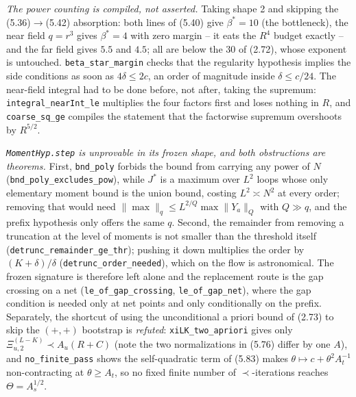 \begin{theorem}
  \emph{The power counting is compiled, not asserted.}  Taking shape 2 and skipping the
  (5.36)$\to$(5.42) absorption: both lines of (5.40) give $\beta^*=10$ (the bottleneck), the near
  field $q=r^3$ gives $\beta^*=4$ with zero margin -- it eats the $R^4$ budget exactly -- and the
  far field gives $5.5$ and $4.5$; all are below the $30$ of (2.72), whose exponent is untouched.
  \texttt{beta\_star\_margin} checks that the regularity hypothesis implies the side conditions as
  soon as $4\delta\le2c$, an order of magnitude inside $\delta\le c/24$.  The near-field integral
  had to be done before, not after, taking the supremum: \texttt{integral\_nearInt\_le} multiplies
  the four factors first and loses nothing in $R$, and \texttt{coarse\_sq\_ge} compiles the
  statement that the factorwise supremum overshoots by $R^{5/2}$.

  \emph{\texttt{MomentHyp.step} is unprovable in its frozen shape, and both obstructions are
  theorems.}  First, \texttt{bnd\_poly} forbids the bound from carrying any power of $N$
  (\texttt{bnd\_poly\_excludes\_pow}), while $J^*$ is a maximum over $L^2$ loops whose only
  elementary moment bound is the union bound, costing $L^2\asymp N^2$ at every order; removing
  that would need $\|\max\|_q\le L^{2/Q}\max\|Y_a\|_Q$ with $Q\gg q$, and the prefix hypothesis
  only offers the same $q$.  Second, the remainder from removing a truncation at the level of
  moments is not smaller than the threshold itself
  (\texttt{detrunc\_remainder\_ge\_thr}); pushing it down multiplies the order by
  $(K+\delta)/\delta$ (\texttt{detrunc\_order\_needed}), which on the flow is astronomical.  The
  frozen signature is therefore left alone and the replacement route is the gap crossing on a net
  (\texttt{le\_of\_gap\_crossing}, \texttt{le\_of\_gap\_net}), where the gap condition is needed
  only at net points and only conditionally on the prefix.  Separately, the shortcut of using the
  unconditional a priori bound of (2.73) to skip the $(+,+)$ bootstrap is \emph{refuted}:
  \texttt{xiLK\_two\_apriori} gives only $\Xi^{(L-K)}_{u,2}\prec A_u(R+C)$ (note the two
  normalizations in (5.76) differ by one $A$), and \texttt{no\_finite\_pass} shows the
  self-quadratic term of (5.83) makes $\theta\mapsto c+\theta^2A_t^{-1}$ non-contracting at
  $\theta\ge A_t$, so no fixed finite number of $\prec$-iterations reaches $\Theta=A_s^{1/2}$.


\end{theorem}
